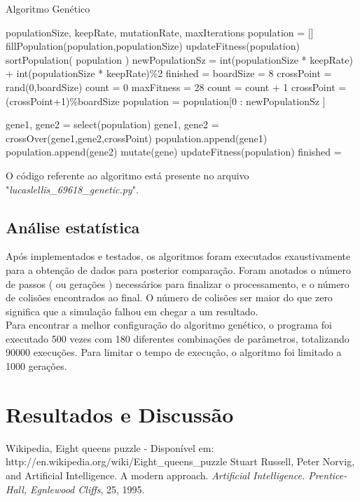 \documentclass[conference]{IEEEtran}
\begin{document}
\begin{algorithm}
	\caption{Algoritmo Genético}
	\begin{algorithmic}[1]
		\REQUIRE populationSize, keepRate, mutationRate, maxIterations
		\STATE population = []
		\STATE fillPopulation(population,populationSize)
		\STATE updateFitness(population)
		\STATE sortPopulation( population )
		\STATE newPopulationSz = int(populationSize * keepRate) + int(populationSize * keepRate)\%2
		\STATE finished = \FALSE
		\STATE boardSize = 8
		\STATE crossPoint = rand(0,boardSize)
		\STATE count = 0
		\STATE maxFitness = 28
		\STATE count = count + 1
		\STATE crossPoint = (crossPoint+1)\%boardSize
		population = population[0 : newPopulationSz ]
		
		\STATE gene1, gene2 = select(population)
		\STATE gene1, gene2 = crossOver(gene1,gene2,crossPoint)
		\STATE population.append(gene1)
		\STATE population.append(gene2)
		\ENDWHILE
		\STATE mutate(gene)
		\ENDIF
		\ENDFOR
		\STATE updateFitness(population)
		\STATE finished = \TRUE 
		\ENDIF
		\ENDWHILE
	\end{algorithmic} 
\end{algorithm}
O código referente ao algoritmo está presente no arquivo "\textit{lucaslellis\_69618\_genetic.py}".

\subsection{Análise estatística}
Após implementados e testados, os algoritmos foram executados exaustivamente para a obtenção de dados para posterior
comparação. Foram anotados o número de passos ( ou gerações ) necessários para finalizar o processamento, e o número de
colisões encontrados ao final. O número de colisões ser maior do que zero significa que a simulação falhou em chegar a um
resultado.\\
Para encontrar a melhor configuração do algoritmo genético, o programa foi executado 500 vezes com 180 diferentes
combinações de parâmetros, totalizando 90000 execuções. Para limitar o tempo de execução, o algoritmo foi limitado a 1000 gerações.

\section{Resultados e Discussão}


\begin{thebibliography}{2}
Wikipedia, Eight queens puzzle - Disponível em: 
 http://en.wikipedia.org/wiki/Eight\_queens\_puzzle
Stuart Russell, Peter Norvig, and Artificial Intelligence. A modern
approach. \textit{Artificial Intelligence. Prentice-Hall, Egnlewood Cliffs}, 25,
1995.
\end{thebibliography}
\end{document}
